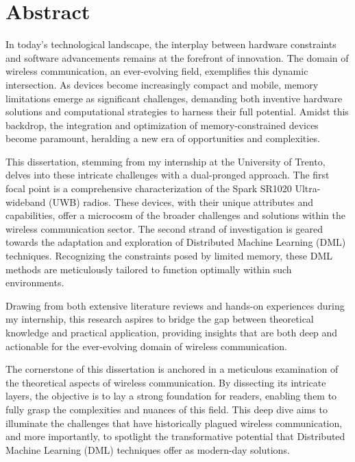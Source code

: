\chapter*{Abstract}
\label{abtract}

In today's technological landscape, the interplay between hardware constraints and software advancements remains at the forefront of innovation. The domain of wireless communication, an ever-evolving field, exemplifies this dynamic intersection. As devices become increasingly compact and mobile, memory limitations emerge as significant challenges, demanding both inventive hardware solutions and computational strategies to harness their full potential. Amidst this backdrop, the integration and optimization of memory-constrained devices become paramount, heralding a new era of opportunities and complexities.

This dissertation, stemming from my internship at the University of Trento, delves into these intricate challenges with a dual-pronged approach. The first focal point is a comprehensive characterization of the Spark SR1020 Ultra-wideband (UWB) radios. These devices, with their unique attributes and capabilities, offer a microcosm of the broader challenges and solutions within the wireless communication sector. The second strand of investigation is geared towards the adaptation and exploration of Distributed Machine Learning (DML) techniques. Recognizing the constraints posed by limited memory, these DML methods are meticulously tailored to function optimally within such environments.

Drawing from both extensive literature reviews and hands-on experiences during my internship, this research aspires to bridge the gap between theoretical knowledge and practical application, providing insights that are both deep and actionable for the ever-evolving domain of wireless communication.

The cornerstone of this dissertation is anchored in a meticulous examination of the theoretical aspects of wireless communication. By dissecting its intricate layers, the objective is to lay a strong foundation for readers, enabling them to fully grasp the complexities and nuances of this field. This deep dive aims to illuminate the challenges that have historically plagued wireless communication, and more importantly, to spotlight the transformative potential that Distributed Machine Learning (DML) techniques offer as modern-day solutions.

